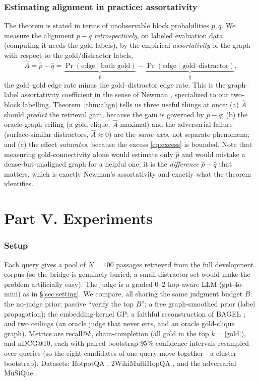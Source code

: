 \documentclass[11pt]{article}
\theoremstyle{plain}
\theoremstyle{definition}
\theoremstyle{remark}
\begin{document}
\section{Estimating alignment in practice: assortativity}\label{sec:assort}
The theorem is stated in terms of unobservable block probabilities $p,q$. We measure the alignment $p-q$
\emph{retrospectively}, on labeled evaluation data (computing it needs the gold labels), by the empirical
\emph{assortativity} of the graph with respect to the gold/distractor labels,
\begin{equation}
\widehat A=\hat p-\hat q=\underbrace{\Pr(\text{edge}\mid\text{both gold})}_{\hat p}-\underbrace{\Pr(\text{edge}\mid\text{gold--distractor})}_{\hat q},
\end{equation}
the gold--gold edge rate minus the gold--distractor edge rate. This is the graph--label assortativity coefficient in
the sense of Newman \citep{newman2003assortativity}, specialized to our two-block labelling. Theorem~\ref{thm:align}
tells us three useful things at once: (a) $\widehat A$ should \emph{predict} the retrieval gain, because the gain is
governed by $p-q$; (b) the oracle-graph ceiling (a gold clique, $\widehat A$ maximal) and the adversarial failure
(surface-similar distractors, $\widehat A\approx0$) are the \emph{same axis}, not separate phenomena; and (c) the
effect \emph{saturates}, because the excess \eqref{eq:excess} is bounded. Note that measuring gold-connectivity
alone would estimate only $\hat p$ and would mistake a dense-but-unaligned graph for a helpful one; it is the
\emph{difference} $\hat p-\hat q$ that matters, which is exactly Newman's assortativity and exactly what the theorem
identifies.

\part*{Part V. Experiments}

\section{Setup}\label{sec:setup}
Each query gives a pool of $N=100$ passages retrieved from the full development corpus (so the bridge is genuinely
buried; a small distractor set would make the problem artificially easy). The judge is a graded $0$--$2$ hop-aware
LLM (gpt-4o-mini) as in \S\ref{sec:setting}. We compare, all sharing the same judgment budget $B$: the no-judge
prior; passive ``verify the top $B$''; a free graph-smoothed prior (label propagation); the embedding-kernel GP;
a faithful reconstruction of BAGEL \citep{bagel2026}; and two ceilings (an oracle judge that never errs, and an
oracle gold-clique graph). Metrics are
recall@$k$, chain-completion (all gold in the top $k=|\text{gold}|$), and nDCG@10, each with paired bootstrap $95\%$
confidence intervals resampled over queries (so the eight candidates of one query move together---a cluster
bootstrap). Datasets: HotpotQA \citep{yang2018hotpotqa}, 2WikiMultiHopQA \citep{ho2020twowiki}, and the adversarial
MuSiQue \citep{trivedi2022musique}.
\end{document}
